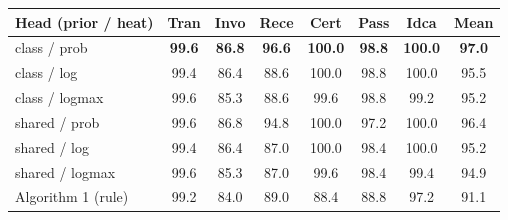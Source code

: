 \begin{tabular}{lccccccc}
\toprule
Head (prior / heat) & Tran & Invo & Rece & Cert & Pass & Idca & Mean\\
\midrule
class / prob & \textbf{99.6} & \textbf{86.8} & \textbf{96.6} & \textbf{100.0} & \textbf{98.8} & \textbf{100.0} & \textbf{97.0}\\
class / log & 99.4 & 86.4 & 88.6 & 100.0 & 98.8 & 100.0 & 95.5\\
class / logmax & 99.6 & 85.3 & 88.6 & 99.6 & 98.8 & 99.2 & 95.2\\
shared / prob & 99.6 & 86.8 & 94.8 & 100.0 & 97.2 & 100.0 & 96.4\\
shared / log & 99.4 & 86.4 & 87.0 & 100.0 & 98.4 & 100.0 & 95.2\\
shared / logmax & 99.6 & 85.3 & 87.0 & 99.6 & 98.4 & 99.4 & 94.9\\
Algorithm 1 (rule) & 99.2 & 84.0 & 89.0 & 88.4 & 88.8 & 97.2 & 91.1\\
\bottomrule
\end{tabular}
